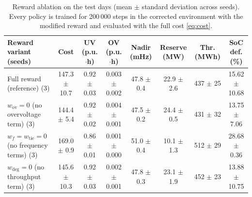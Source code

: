 \begin{table}[!t]
\caption{Reward ablation on the test days (mean $\pm$ standard deviation across seeds). Every policy is trained for 200\,000 steps in the corrected environment with the modified reward and evaluated with the full cost \eqref{eq:cost}.}
\label{tab:ablation}
\centering
\footnotesize
\setlength{\tabcolsep}{4pt}
\begin{tabular}{lccccccc}
\toprule
\textbf{Reward variant (seeds)} & \textbf{Cost} & \textbf{UV (p.u.$\cdot$h)} & \textbf{OV (p.u.$\cdot$h)} & \textbf{Nadir (mHz)} & \textbf{Reserve (MW)} & \textbf{Thr. (MWh)} & \textbf{SoC def. (\%)}\\
\midrule
Full reward (reference) (3) & 147.3 $\pm$ 10.7 & 0.92 $\pm$ 0.03 & 0.003 $\pm$ 0.002 & 47.8 $\pm$ 0.4 & 22.9 $\pm$ 2.6 & 437 $\pm$ 25 & 15.62 $\pm$ 10.68 \\
$w_{\mathrm{ov}}=0$ (no overvoltage term) (3) & 144.4 $\pm$ 5.4 & 0.92 $\pm$ 0.02 & 0.004 $\pm$ 0.001 & 47.5 $\pm$ 0.2 & 24.4 $\pm$ 0.5 & 431 $\pm$ 32 & 13.75 $\pm$ 7.06 \\
$w_f=w_{\mathrm{tie}}=0$ (no frequency terms) (3) & 169.0 $\pm$ 0.9 & 0.86 $\pm$ 0.01 & 0.001 $\pm$ 0.000 & 51.0 $\pm$ 0.4 & 10.1 $\pm$ 1.3 & 512 $\pm$ 29 & 28.68 $\pm$ 0.36 \\
$w_{\mathrm{deg}}=0$ (no throughput term) (3) & 145.6 $\pm$ 10.3 & 0.92 $\pm$ 0.03 & 0.002 $\pm$ 0.001 & 47.8 $\pm$ 0.3 & 23.1 $\pm$ 1.9 & 452 $\pm$ 23 & 13.88 $\pm$ 10.75 \\
\bottomrule
\end{tabular}
\end{table}
